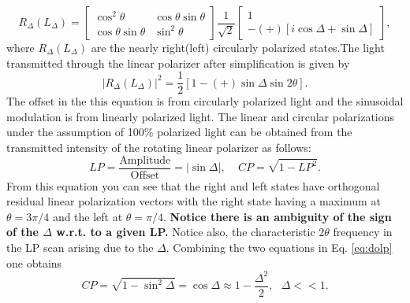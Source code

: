 \documentclass[12pt]{article}
\begin{document}
\begin{equation}
\label{eq:jones}
R_\Delta(L_\Delta)=
\begin{bmatrix}
\cos^2\theta & \cos\theta\sin\theta\\
\cos\theta\sin\theta & \sin^2\theta
\end{bmatrix}
\frac{1}{\sqrt{2}}
\begin{bmatrix}
1\\
-(+)[i\cos\Delta+\sin\Delta]
\end{bmatrix},
\end{equation}
where $R_\Delta(L_\Delta)$ are the nearly right(left) circularly polarized states.The light transmitted through the linear polarizer after simplification is given by
\begin{equation}
\left| R_\Delta(L_\Delta)\right|^2= \frac{1}{2}\left[1-(+)\sin\Delta\sin2\theta\right].
\end{equation}
The offset in the this equation is from circularly polarized light and the sinusoidal modulation is from linearly polarized light. The linear and circular polarizations under the assumption of 100\% polarized light can be obtained from the transmitted intensity of the rotating linear polarizer as follows:
\begin{equation}
\label{eq:dolp}
LP = \frac{\textrm{Amplitude}}{\textrm{Offset}}=\left|\sin\Delta\right|, ~~~~~CP = \sqrt{1-LP^2}.
\end{equation}
From this equation you can see that the right and left states have orthogonal residual linear polarization vectors with the right state having a maximum at $\theta=3\pi/4$ and the left at $\theta=\pi/4$. \textbf{Notice there is an ambiguity of the sign of the $\Delta$ w.r.t. to a given LP.} Notice also, the characteristic $2\theta$ frequency in the LP scan arising due to the $\Delta$. Combining the two equations in Eq. \ref{eq:dolp} one obtains
\begin{equation}
\label{eq:docp}
CP = \sqrt{1-\sin^2\Delta}=\cos\Delta\approx1-\frac{\Delta^2}{2}, ~~~\Delta<<1.
\end{equation}
\end{document}
